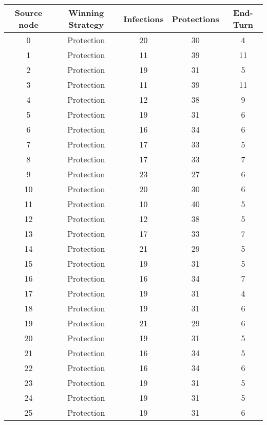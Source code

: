 \documentclass[results.tex]{subfiles}
\begin{document}
\begin{center}
  \begin{tabular}{| c || c | c | c | c |}
    \hline
    {\bfseries Source node} & {\bfseries Winning Strategy} & {\bfseries Infections} & {\bfseries Protections} & {\bfseries End-Turn} \\  %
    \hline\hline
    0 & Protection & 20 & 30 & 4 \\ 
    \hline
    1 & Protection & 11 & 39 & 11 \\ 
    \hline
    2 & Protection & 19 & 31 & 5 \\ 
    \hline
    3 & Protection & 11 & 39 & 11 \\ 
    \hline
    4 & Protection & 12 & 38 & 9 \\ 
    \hline
    5 & Protection & 19 & 31 & 6 \\ 
    \hline
    6 & Protection & 16 & 34 & 6 \\ 
    \hline
    7 & Protection & 17 & 33 & 5 \\ 
    \hline
    8 & Protection & 17 & 33 & 7 \\ 
    \hline
    9 & Protection & 23 & 27 & 6 \\ 
    \hline
    10 & Protection & 20 & 30 & 6 \\ 
    \hline
    11 & Protection & 10 & 40 & 5 \\ 
    \hline
    12 & Protection & 12 & 38 & 5 \\ 
    \hline
    13 & Protection & 17 & 33 & 7 \\ 
    \hline
    14 & Protection & 21 & 29 & 5 \\ 
    \hline
    15 & Protection & 19 & 31 & 5 \\ 
    \hline
    16 & Protection & 16 & 34 & 7 \\ 
    \hline
    17 & Protection & 19 & 31 & 4 \\ 
    \hline
    18 & Protection & 19 & 31 & 6 \\ 
    \hline
    19 & Protection & 21 & 29 & 6 \\ 
    \hline
    20 & Protection & 19 & 31 & 5 \\ 
    \hline
    21 & Protection & 16 & 34 & 5 \\ 
    \hline
    22 & Protection & 16 & 34 & 6 \\ 
    \hline
    23 & Protection & 19 & 31 & 5 \\ 
    \hline
    24 & Protection & 19 & 31 & 5 \\ 
    \hline
    25 & Protection & 19 & 31 & 6 \\ 

\end{tabular}
\end{center}
\end{document}
